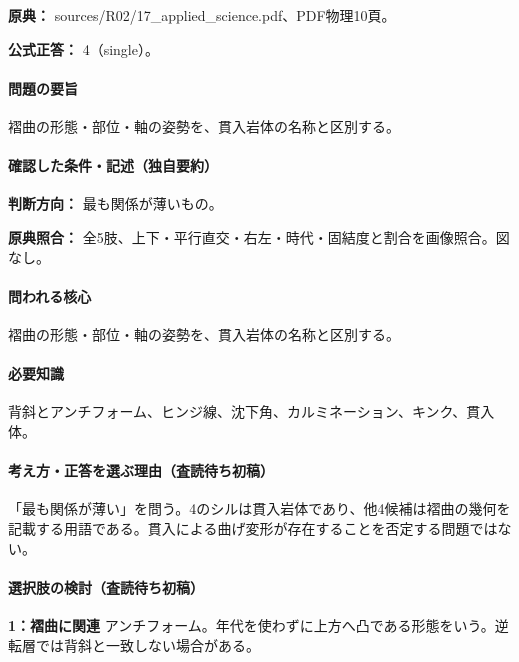 \noindent\textbf{原典：} sources/R02/17\_applied\_science.pdf、PDF物理10頁。

\textbf{公式正答：} 4（single）。

\paragraph{問題の要旨} 褶曲の形態・部位・軸の姿勢を、貫入岩体の名称と区別する。

\paragraph{確認した条件・記述（独自要約）}\mbox{}\par

\noindent\textbf{判断方向：} 最も関係が薄いもの。\par

\noindent\textbf{原典照合：} 全5肢、上下・平行直交・右左・時代・固結度と割合を画像照合。図なし。\par

\paragraph{問われる核心} 褶曲の形態・部位・軸の姿勢を、貫入岩体の名称と区別する。

\paragraph{必要知識} 背斜とアンチフォーム、ヒンジ線、沈下角、カルミネーション、キンク、貫入体。

\paragraph{考え方・正答を選ぶ理由（査読待ち初稿）} 「最も関係が薄い」を問う。4のシルは貫入岩体であり、他4候補は褶曲の幾何を記載する用語である。貫入による曲げ変形が存在することを否定する問題ではない。

\paragraph{選択肢の検討（査読待ち初稿）}\mbox{}\par

\noindent\textbf{1：褶曲に関連} アンチフォーム。年代を使わずに上方へ凸である形態をいう。逆転層では背斜と一致しない場合がある。\par


